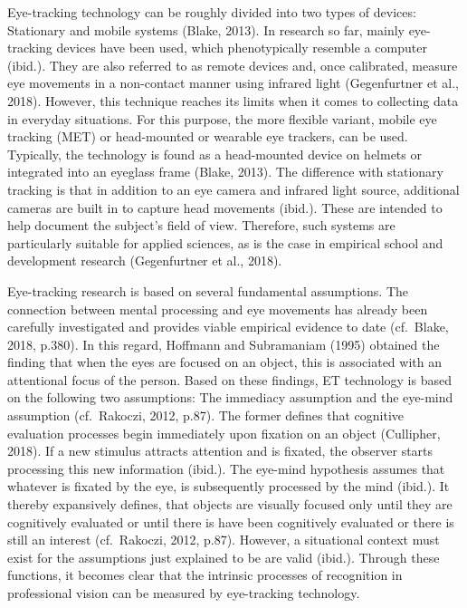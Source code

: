 \documentclass[
  man]{apa6}
\begin{document}
Eye-tracking technology can be roughly divided into two types of devices: Stationary and mobile systems (Blake, 2013). In research so far, mainly eye-tracking devices have been used, which phenotypically resemble a computer (ibid.). They are also referred to as remote devices and, once calibrated, measure eye movements in a non-contact manner using infrared light (Gegenfurtner et al., 2018). However, this technique reaches its limits when it comes to collecting data in everyday situations. For this purpose, the more flexible variant, mobile eye tracking (MET) or head-mounted or wearable eye trackers, can be used. Typically, the technology is found as a head-mounted device on helmets or integrated into an eyeglass frame (Blake, 2013). The difference with stationary tracking is that in addition to an eye camera and infrared light source, additional cameras are built in to capture head movements (ibid.). These are intended to help document the subject's field of view. Therefore, such systems are particularly suitable for applied sciences, as is the case in empirical school and development research (Gegenfurtner et al., 2018).

Eye-tracking research is based on several fundamental assumptions. The connection between mental processing and eye movements has already been carefully investigated and provides viable empirical evidence to date (cf.~Blake, 2018, p.380). In this regard, Hoffmann and Subramaniam (1995) obtained the finding that when the eyes are focused on an object, this is associated with an attentional focus of the person. Based on these findings, ET technology is based on the following two assumptions: The immediacy assumption and the eye-mind assumption (cf.~Rakoczi, 2012, p.87). The former defines that cognitive evaluation processes begin immediately upon fixation on an object (Cullipher, 2018). If a new stimulus attracts attention and is fixated, the observer starts processing this new information (ibid.). The eye-mind hypothesis assumes that whatever is fixated by the eye, is subsequently processed by the mind (ibid.). It thereby expansively defines, that objects are visually focused only until they are cognitively evaluated or until there is have been cognitively evaluated or there is still an interest (cf.~Rakoczi, 2012, p.87). However, a situational context must exist for the assumptions just explained to be are valid (ibid.). Through these functions, it becomes clear that the intrinsic processes of recognition in professional vision can be measured by eye-tracking technology.
\end{document}
